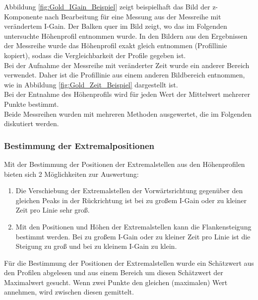 \documentclass[12pt,a4paper]{article}
\begin{document}
Abbildung \ref{fig:Gold_IGain_Beispiel} zeigt beispielhaft das Bild der z-Komponente nach Bearbeitung für eine Messung aus der Messreihe mit verändertem I-Gain. Der Balken quer im Bild zeigt, wo das im Folgenden untersuchte Höhenprofil entnommen wurde. In den Bildern aus den Ergebnissen der Messreihe wurde das Höhenprofil exakt gleich entnommen (Profillinie kopiert), sodass die Vergleichbarkeit der Profile gegeben ist.\\
Bei der Aufnahme der Messreihe mit veränderter Zeit wurde ein anderer Bereich verwendet. Daher ist die Profillinie aus einem anderen Bildbereich entnommen, wie in Abbildung \ref{fig:Gold_Zeit_Beispiel} dargestellt ist.\\
Bei der Entnahme des Höhenprofils wird für jeden Wert der Mittelwert mehrerer Punkte bestimmt.\\
Beide Messreihen wurden mit mehreren Methoden ausgewertet, die im Folgenden diskutiert werden.

\subsubsection{Bestimmung der Extremalpositionen}
Mit der Bestimmung der Positionen der Extremalstellen aus den Höhenprofilen bieten sich 2 Möglichkeiten zur Auswertung:
\begin{enumerate}
\item Die Verschiebung der Extremalstellen der Vorwärtsrichtung gegenüber den gleichen Peaks in der Rückrichtung ist bei zu großem I-Gain oder zu kleiner Zeit pro Linie sehr groß.
\item Mit den Positionen und Höhen der Extremalstellen kann die Flankensteigung bestimmt werden. Bei zu großem I-Gain oder zu kleiner Zeit pro Linie ist die Steigung zu groß und bei zu kleinem I-Gain zu klein.
\end{enumerate}

Für die Bestimmung der Positionen der Extremalstellen wurde ein Schätzwert aus den Profilen abgelesen und aus einem Bereich um diesen Schätzwert der Maximalwert gesucht. Wenn zwei Punkte den gleichen (maximalen) Wert annehmen, wird zwischen diesen gemittelt.
\end{document}
